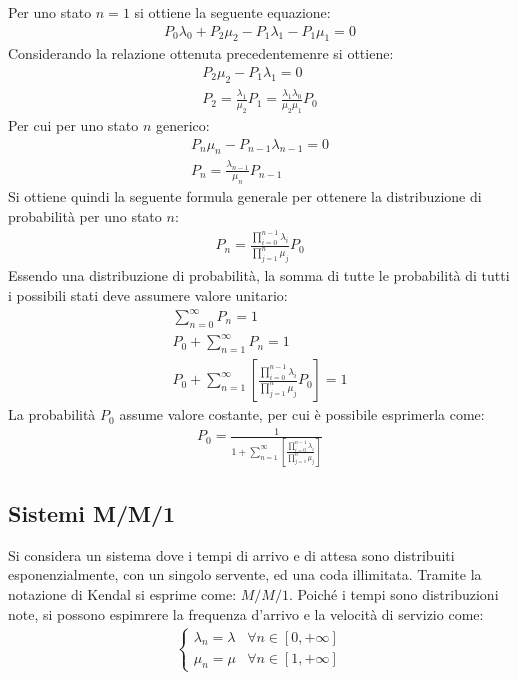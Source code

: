 \documentclass{article}
\numberwithin{equation}{subsection}
\begin{document}
Per uno stato $n=1$ si ottiene la seguente equazione:
\begin{gather*}
    P_0\lambda_0+P_2\mu_2-P_1\lambda_1-P_1\mu_1=0
\end{gather*}
Considerando la relazione ottenuta precedentemenre si ottiene:
\begin{gather*}
    P_2\mu_2-P_1\lambda_1=0\\
    P_2=\displaystyle\frac{\lambda_1}{\mu_2}P_1=\frac{\lambda_1\lambda_0}{\mu_2\mu_1}P_0
\end{gather*}
Per cui per uno stato $n$ generico:
\begin{gather*}
    P_n\mu_n-P_{n-1}\lambda_{n-1}=0\\
    P_n=\displaystyle\frac{\lambda_{n-1}}{\mu_{n}}P_{n-1}
\end{gather*}
Si ottiene quindi la seguente formula generale per ottenere la distribuzione di probabilità per uno stato $n$:
\begin{gather*}
    P_n=\displaystyle\frac{\displaystyle\prod_{i=0}^{n-1}\lambda_i}{\displaystyle\prod_{j=1}^n\mu_j}P_0
\end{gather*}
Essendo una distribuzione di probabilità, la somma di tutte le probabilità di tutti i possibili stati deve assumere valore unitario:
\begin{gather*}
    \displaystyle\sum_{n=0}^{\infty}P_n=1\\
    P_0+\displaystyle\sum_{n=1}^{\infty}P_n=1\\
    P_0+\displaystyle\sum_{n=1}^{\infty}\left[\frac{\displaystyle\prod_{i=0}^{n-1}\lambda_i}{\displaystyle\prod_{j=1}^n\mu_j}P_0\right]=1
\end{gather*}
La probabilità $P_0$ assume valore costante, per cui è possibile esprimerla come:
\begin{gather*}
    P_0=\displaystyle\frac{1}{1+\displaystyle\sum_{n=1}^{\infty}\left[\frac{\displaystyle\prod_{i=0}^{n-1}\lambda_i}{\displaystyle\prod_{j=1}^n\mu_j}\right]}
\end{gather*}

\subsection{Sistemi M/M/1}

Si considera un sistema dove i tempi di arrivo e di attesa sono distribuiti esponenzialmente, con un singolo servente, ed una coda illimitata. Tramite la notazione di Kendal 
si esprime come: $M/M/1$. Poiché i tempi sono distribuzioni note, si possono espimrere la frequenza d'arrivo e la velocità di servizio come:
\begin{gather*}
    \begin{cases}
        \lambda_n=\lambda &\forall n\in[0,+\infty]\\
        \mu_n=\mu&\forall n\in[1,+\infty]        
    \end{cases}
\end{gather*}
\end{document}
